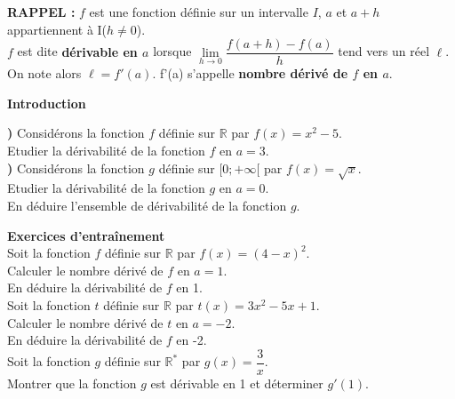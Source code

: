 \documentclass[a4paper,12pt,twoside,french]{extarticle}
\newcommand{\R}{\ensuremath{\mathbb{R}}\xspace}
\newcounter{enumtabi}
\newcommand{\q}{\textbf{\stepcounter{enumtabi} \theenumtabi) } }
\newcommand{\initq}{\setcounter{enumtabi}{0}}
\newcounter{exo}
\begin{document}
\color{purple}
\vspace*{0.5cm}

\textbf{RAPPEL : } $f$ est une fonction définie sur un intervalle $I$, $a$ et $a+h$ appartiennent à I($h \neq 0$).\\

$f$ est dite \textbf{dérivable en $a$} lorsque $\lim\limits_{h \rightarrow 0} \dfrac{f(a+h)-f(a)}{h}$ tend vers un réel $\ell$.\\

On note alors $\ell=f'(a)$. f'(a) s'appelle \textbf{nombre dérivé de $f$ en $a$}.\\
\color{black}


\vspace*{0.5cm}

\begin{center}
{\large \textbf{Introduction}}
\end{center}

\initq \q Considérons la fonction $f$ définie sur $\R$ par $f(x)=x^2-5$.\\
Etudier la dérivabilité de la fonction $f$ en $a=3$.\\

 \q Considérons la fonction $g$ définie sur $[0;+\infty[$ par $f(x)=\sqrt{x}$.\\ 
 Etudier la dérivabilité de la fonction $g$ en $a=0$.\\
  En déduire l'ensemble de dérivabilité de la fonction $g$.\\

 
\vspace*{1cm}

\textbf{{\large Exercices d'entraînement}}\\

\exo
Soit la fonction $f$ définie sur $\R$ par $f(x)=(4-x)^2$.\\
Calculer le nombre dérivé de $f$ en $a=1$.\\
En déduire la dérivabilité de $f$ en 1.\\

\exo
Soit la fonction $t$ définie sur $\R$ par $t(x)=3x^2-5x+1$.\\
Calculer le nombre dérivé de $t$ en $a=-2$.\\
En déduire la dérivabilité de $f$ en -2.\\

\exo
Soit la fonction $g$ définie sur $\R^*$ par $g(x)=\dfrac{3}{x}$.\\
Montrer que la fonction $g$ est dérivable en 1 et déterminer $g'(1)$.\\
\end{document}
